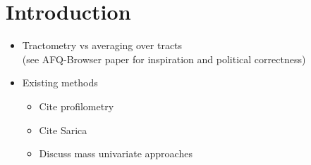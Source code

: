 \section*{Introduction}

\begin{itemize}
  \item Tractometry vs averaging over tracts \\
    (see AFQ-Browser paper for inspiration and political correctness)
  \item Existing methods
    \begin{itemize}
      \item Cite profilometry\cite{dayan2016profilometry}
      \item Cite Sarica\cite{sarica2017corticospinal}
      \item Discuss mass univariate approaches\cite{yeatman2014lifespan}
    \end{itemize}
\end{itemize}

